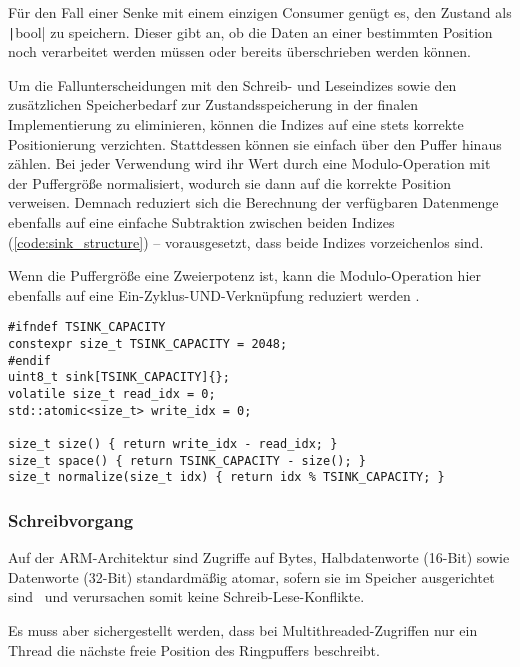 Für den Fall einer Senke mit einem einzigen Consumer genügt es, den Zustand als
\texttt|bool| zu speichern. Dieser gibt an, ob die Daten an einer
bestimmten Position noch verarbeitet werden müssen oder bereits überschrieben
werden können.

Um die Fallunterscheidungen mit den Schreib- und Leseindizes sowie den
zusätzlichen Speicherbedarf zur Zustandsspeicherung in der finalen
Implementierung zu eliminieren, können die Indizes auf eine stets korrekte
Positionierung verzichten. Stattdessen können sie einfach über den Puffer hinaus
zählen. Bei jeder Verwendung wird ihr Wert durch eine Modulo-Operation mit der
Puffergröße normalisiert, wodurch sie dann auf die korrekte Position verweisen.
Demnach reduziert sich die Berechnung der verfügbaren Datenmenge ebenfalls auf
eine einfache Subtraktion zwischen beiden Indizes (\ref{code:sink_structure}) --
vorausgesetzt, dass beide Indizes vorzeichenlos sind.

Wenn die Puffergröße eine Zweierpotenz ist, kann die Modulo-Operation hier
ebenfalls auf eine Ein-Zyklus-UND-Verknüpfung reduziert werden
\cite{stackoverflow_mod, arm_instruction_set}.

\begin{code}
\begin{verbatim}
#ifndef TSINK_CAPACITY
constexpr size_t TSINK_CAPACITY = 2048;
#endif
uint8_t sink[TSINK_CAPACITY]{};
volatile size_t read_idx = 0;
std::atomic<size_t> write_idx = 0;

size_t size() { return write_idx - read_idx; }
size_t space() { return TSINK_CAPACITY - size(); }
size_t normalize(size_t idx) { return idx % TSINK_CAPACITY; }
\end{verbatim}
    \label{code:sink_structure}
\end{code}

\subsubsection{Schreibvorgang}

Auf der ARM-Architektur sind Zugriffe auf Bytes, Halbdatenworte (16-Bit) sowie
Datenworte (32-Bit) standardmäßig atomar, sofern sie im Speicher ausgerichtet
sind~\cite[S. A3-79]{ARM_DDI0403_EE} und verursachen somit keine
Schreib-Lese-Konflikte.

Es muss aber sichergestellt werden, dass bei Multithreaded-Zugriffen nur ein
Thread die nächste freie Position des Ringpuffers beschreibt.

